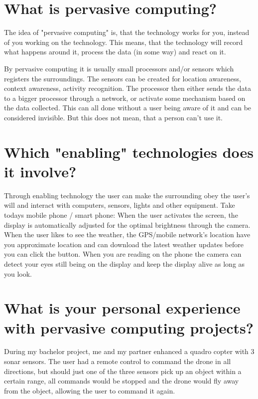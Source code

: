 \documentclass[Main]{subfiles}
\begin{document}
\section*{What is pervasive computing?} 
\vspace{-15pt}
The idea of "pervasive computing" is, that the technology works for you, instead of you working on the technology.
This means, that the technology will record what happens around it, process the data (in some way) and react on it.

By pervasive computing it is usually small processors and/or sensors which registers the surroundings.
The sensors can be created for location awareness, context awareness, activity recognition.
The processor then either sends the data to a bigger processor through a network, or activate some mechanism based on the data collected.
This can all done without a user being aware of it and can be considered invisible. 
But this does not mean, that a person can't use it. 




\section*{Which "enabling" technologies does it involve?} 
\vspace{-15pt}
Through enabling technology the user can make the surrounding obey the user's will and interact with computers, sensors, lights and other equipment.
Take todays mobile phone / smart phone: 
When the user activates the screen, the display is automatically adjusted for the optimal brightness through the camera.
When the user likes to see the weather, the GPS/mobile network's location have you approximate location and can download the latest weather updates before you can click the button.
When you are reading on the phone the camera can detect your eyes still being on the display and keep the display alive as long as you look.




\section*{What is your personal experience with pervasive computing projects?}
\vspace{-15pt}
During my bachelor project, me and my partner enhanced a quadro copter with 3 sonar sensors.
The user had a remote control to command the drone in all directions, but should just one of the three sensors pick up an object within a certain range, all commands would be stopped and the drone would fly away from the object, allowing the user to command it again.
\end{document}
